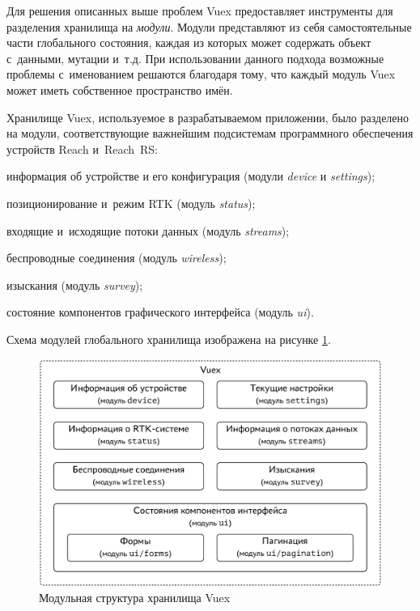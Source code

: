Для решения описанных выше проблем Vuex предоставляет инструменты для разделения хранилища на \emph{модули}. Модули представляют из себя самостоятельные части глобального состояния, каждая из которых может содержать объект с~данными, мутации и~т.д. При использовании данного подхода возможные проблемы с~именованием решаются благодаря тому, что каждый модуль Vuex может иметь собственное пространство имён.


Хранилище Vuex, используемое в разрабатываемом приложении, было разделено на модули, соответствующие важнейшим подсистемам программного обеспечения устройств Reach и~Reach~RS:
\begin{dashitemize}
  \item информация об устройстве и его конфигурация (модули \emph{device} и \emph{settings});
  \item позиционирование и~режим RTK (модуль \emph{status});
  \item входящие и~исходящие потоки данных (модуль \emph{streams});
  \item беспроводные соединения (модуль \emph{wireless});
  \item изыскания (модуль \emph{survey});
  \item состояние компонентов графического интерфейса (модуль \emph{ui}).
\end{dashitemize}

Схема модулей глобального хранилища изображена на рисунке \ref{fig:vuex-modules}.

\begin{figure}[h!]
  \centering
  \setlength{\fboxsep}{5pt}
  \includegraphics[width=.9\textwidth]{img/tikz/vuex-modules/pic}
  \vspace*{6pt}
  \caption{Модульная структура хранилища Vuex}\label{fig:vuex-modules}
\end{figure}



